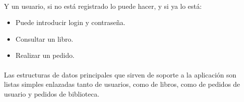 	\paragraph{}Y un usuario, si no está registrado lo puede hacer, y si ya lo está:
	
	\begin{itemize}
		\item Puede introducir login y contraseña.
		\item Consultar un libro.
		\item Realizar un pedido.
	\end{itemize}

	\paragraph{}Las estructuras de datos principales que sirven de soporte a la aplicación son listas simples enlazadas tanto de usuarios, como de libros, como de pedidos de usuario y pedidos de biblioteca.
	
	\newpage
	
